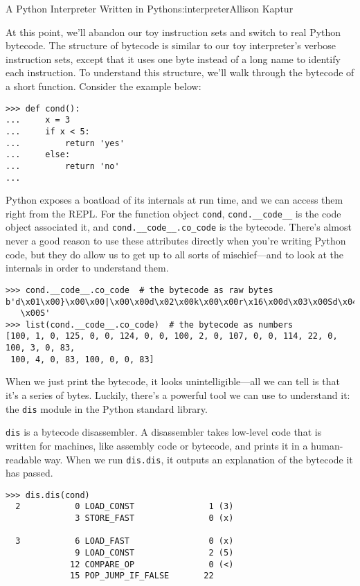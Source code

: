 \begin{aosachapter}{A Python Interpreter Written in Python}{s:interpreter}{Allison Kaptur}
\label{real-python-bytecode}

At this point, we'll abandon our toy instruction sets and switch to real
Python bytecode. The structure of bytecode is similar to our toy
interpreter's verbose instruction sets, except that it uses one byte
instead of a long name to identify each instruction. To understand this
structure, we'll walk through the bytecode of a short function. Consider
the example below:

\begin{verbatim}
>>> def cond():
...     x = 3
...     if x < 5:
...         return 'yes'
...     else:
...         return 'no'
...
\end{verbatim}

Python exposes a boatload of its internals at run time, and we can
access them right from the REPL. For the function object \texttt{cond},
\texttt{cond.\_\_code\_\_} is the code object associated it, and
\texttt{cond.\_\_code\_\_.co\_code} is the bytecode. There's almost
never a good reason to use these attributes directly when you're writing
Python code, but they do allow us to get up to all sorts of
mischief---and to look at the internals in order to understand them.

\begin{verbatim}
>>> cond.__code__.co_code  # the bytecode as raw bytes
b'd\x01\x00}\x00\x00|\x00\x00d\x02\x00k\x00\x00r\x16\x00d\x03\x00Sd\x04\x00Sd\x00
   \x00S'
>>> list(cond.__code__.co_code)  # the bytecode as numbers
[100, 1, 0, 125, 0, 0, 124, 0, 0, 100, 2, 0, 107, 0, 0, 114, 22, 0, 100, 3, 0, 83, 
 100, 4, 0, 83, 100, 0, 0, 83]
\end{verbatim}

When we just print the bytecode, it looks unintelligible---all we can
tell is that it's a series of bytes. Luckily, there's a powerful tool we
can use to understand it: the \texttt{dis} module in the Python standard
library.

\texttt{dis} is a bytecode disassembler. A disassembler takes low-level
code that is written for machines, like assembly code or bytecode, and
prints it in a human-readable way. When we run \texttt{dis.dis}, it
outputs an explanation of the bytecode it has passed.

\begin{verbatim}
>>> dis.dis(cond)
  2           0 LOAD_CONST               1 (3)
              3 STORE_FAST               0 (x)

  3           6 LOAD_FAST                0 (x)
              9 LOAD_CONST               2 (5)
             12 COMPARE_OP               0 (<)
             15 POP_JUMP_IF_FALSE       22


\end{verbatim}
\end{aosachapter}
